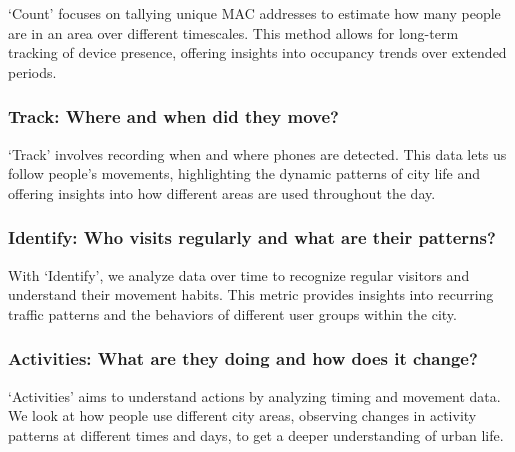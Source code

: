 \documentclass[
  letterpaper,
]{scrbook}
\begin{document}
`Count' focuses on tallying unique MAC addresses to estimate how many
people are in an area over different timescales. This method allows for
long-term tracking of device presence, offering insights into occupancy
trends over extended periods.

\hypertarget{track-where-and-when-did-they-move}{%
\subsubsection*{\texorpdfstring{\textbf{Track: Where and when did they
move?}}{Track: Where and when did they move?}}\label{track-where-and-when-did-they-move}}

`Track' involves recording when and where phones are detected. This data
lets us follow people's movements, highlighting the dynamic patterns of
city life and offering insights into how different areas are used
throughout the day.

\hypertarget{identify-who-visits-regularly-and-what-are-their-patterns}{%
\subsubsection*{\texorpdfstring{\textbf{Identify: Who visits regularly
and what are their
patterns?}}{Identify: Who visits regularly and what are their patterns?}}\label{identify-who-visits-regularly-and-what-are-their-patterns}}

With `Identify', we analyze data over time to recognize regular visitors
and understand their movement habits. This metric provides insights into
recurring traffic patterns and the behaviors of different user groups
within the city.

\hypertarget{activities-what-are-they-doing-and-how-does-it-change}{%
\subsubsection*{\texorpdfstring{\textbf{Activities: What are they doing
and how does it
change?}}{Activities: What are they doing and how does it change?}}\label{activities-what-are-they-doing-and-how-does-it-change}}

`Activities' aims to understand actions by analyzing timing and movement
data. We look at how people use different city areas, observing changes
in activity patterns at different times and days, to get a deeper
understanding of urban life.
\end{document}
